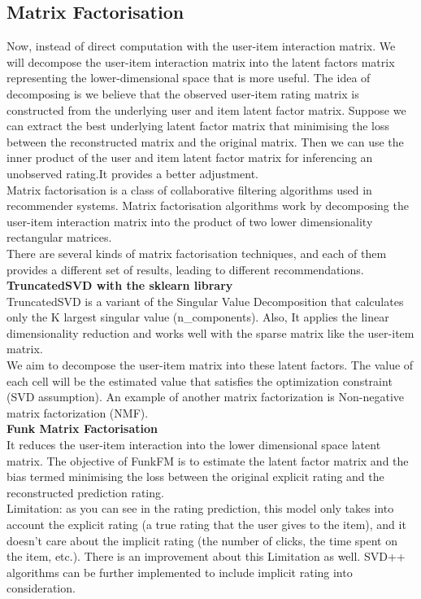 \subsection{Matrix Factorisation}
Now, instead of direct computation with the user-item interaction matrix. We will decompose the user-item interaction matrix into the latent factors matrix representing the lower-dimensional space that is more useful. The idea of decomposing is we believe that the observed user-item rating matrix is constructed from the underlying user and item latent factor matrix. Suppose we can extract the best underlying latent factor matrix that minimising the loss between the reconstructed matrix and the original matrix. Then we can use the inner product of the user and item latent factor matrix for inferencing an unobserved rating.It provides a better  adjustment.
\\Matrix factorisation is a class of collaborative filtering algorithms used in recommender systems. Matrix factorisation algorithms work by decomposing the user-item interaction matrix into the product of two lower dimensionality rectangular matrices.
\\There are several kinds of matrix factorisation techniques, and each of them provides a different set of results, leading to different recommendations.
\\ \textbf{TruncatedSVD with the sklearn library}
\\TruncatedSVD is a variant of the Singular Value Decomposition that calculates only the K largest singular value (n\_components). Also, It applies the linear dimensionality reduction and works well with the sparse matrix like the user-item matrix.
\\We aim to decompose the user-item matrix into these latent factors. The value of each cell will be the estimated value that satisfies the optimization constraint (SVD assumption). An example of another matrix factorization is Non-negative matrix factorization (NMF).
\\ \textbf{Funk Matrix Factorisation}
\\It reduces the user-item interaction into the lower dimensional space latent matrix. The objective of FunkFM is to estimate the latent factor matrix and the bias termed minimising the loss between the original explicit rating and the reconstructed prediction rating.
\\ Limitation: as you can see in the rating prediction, this model only takes into account the explicit rating (a true rating that the user gives to the item), and it doesn't care about the implicit rating (the number of clicks, the time spent on the item, etc.). There is an improvement about this Limitation as well. SVD++ algorithms can be further implemented to include implicit rating into consideration.
